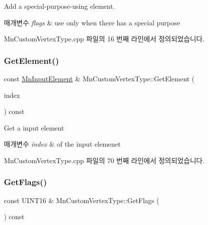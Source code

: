 Add a special-\/purpose-\/using element. 
\begin{DoxyParams}{매개변수}
{\em flags} & use only when there has a special purpose \\
\hline
\end{DoxyParams}


Mn\+Custom\+Vertex\+Type.\+cpp 파일의 16 번째 라인에서 정의되었습니다.

\mbox{\label{class_m_n_l_1_1_mn_custom_vertex_type_ac7f43f6d20d9bf260b1afddd990b6056}} 
\subsubsection{\texorpdfstring{Get\+Element()}{GetElement()}}
{\footnotesize\ttfamily const \hyperlink{class_m_n_l_1_1_mn_input_element}{Mn\+Input\+Element} \& Mn\+Custom\+Vertex\+Type\+::\+Get\+Element (\begin{DoxyParamCaption}\item[{U\+I\+NT}]{index }\end{DoxyParamCaption}) const}

Get a input element 
\begin{DoxyParams}{매개변수}
{\em index} & of the input elemenet \\
\hline
\end{DoxyParams}


Mn\+Custom\+Vertex\+Type.\+cpp 파일의 70 번째 라인에서 정의되었습니다.

\mbox{\label{class_m_n_l_1_1_mn_custom_vertex_type_a1dbc7a044aaa7f1077d8338b4f510a21}} 
\subsubsection{\texorpdfstring{Get\+Flags()}{GetFlags()}}
{\footnotesize\ttfamily const U\+I\+N\+T16 \& Mn\+Custom\+Vertex\+Type\+::\+Get\+Flags (\begin{DoxyParamCaption}{ }\end{DoxyParamCaption}) const}



